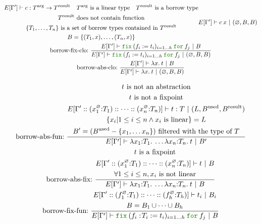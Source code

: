\documentclass[a4paper,fleqn]{article}
\newcommand{\kwfix}{\mbox{\color{mygreen}\ttfamily fix}}
\newcommand{\kwfor}{\mbox{\color{mygreen}\ttfamily for}}
\newcommand{\lam}[2]{\lambda #1.\:#2}
\newcommand{\lamTB}[2]{\lambda #1\mathord{:}#2.\:}
\newcommand{\lassum}[2]{(#1\mathord{:}#2)}
\newcommand{\fix}[4]{\kwfix\:(#1 := #2)_{#3}\:\kwfor\:#4}
\newcommand{\fixT}[5]{\kwfix\:(#1:\!#2 := #3)_{#4}\:\kwfor\:#5}
\begin{document}
\begin{gather*}
{\begin{gathered}
        E[\Gamma'] \vdash c : T^\text{arg} \rightarrow T^\text{result} \quad
        \text{$T^\text{arg}$ is a linear type} \quad
        \text{$T^\text{result}$ is a borrow type} \\
        \text{$T^\text{result}$ does not contain function} \\
        \text{$\{T_1, \ldots, T_n\}$ is a set of borrow types contained in $T^\text{result}$} \\
        B = \{(T_1,x),\ldots,(T_n,x)\}
      \end{gathered}
    }{
      E[\Gamma'] \vdash c\:x ~|~ (\varnothing, B, B)
    } \\
  \text{borrow-fix-clo:}~
    \dfrac{
      E[\Gamma'] \vdash \fix{f_i}{t_i}{i=1\ldots h}{f_j} ~|~ B
    }{
      E[\Gamma'] \vdash \fix{f_i}{t_i}{i=1\ldots h}{f_j} ~|~ (\varnothing, B, B)
    } \\
  \text{borrow-abs-clo:}~
    \dfrac{
      E[\Gamma'] \vdash \lam{x}{t} ~|~ B
    }{
      E[\Gamma'] \vdash \lam{x}{t} ~|~ (\varnothing, B, B)
    } \\
\end{gather*}

\begin{gather*}
  \text{borrow-abs-fun:}~
    \dfrac{
      \begin{gathered}
        \text{$t$ is not an abstraction} \\
        \text{$t$ is not a fixpoint} \\
        E[\Gamma'::\lassum{x_1^\varnothing}{T_1}::\cdots::\lassum{x_n^\varnothing}{T_n}] \vdash t : T ~|~ (L,B^\text{used},B^\text{result}) \\
        \{ x_i | 1 \leq i \leq n \wedge \text{$x_i$ is linear} \} = L \\
        B' = (B^\text{used} - \{x_1,\ldots x_n\}) ~\text{filtered with the type of $T$} \\
      \end{gathered}
    }{
      E[\Gamma'] \vdash \lamTB{x_1}{T_1}\ldots\lamTB{x_n}{T_n}t ~|~ B'
    } \\
  \text{borrow-abs-fix:}~
    \dfrac{
      \begin{gathered}
        \text{$t$ is a fixpoint} \\
        E[\Gamma'::\lassum{x_1^\varnothing}{T_1}::\cdots::\lassum{x_n^\varnothing}{T_n}] \vdash t ~|~ B \\
        \forall 1 \leq i \leq n, \text{$x_i$ is not linear} \\
      \end{gathered}
    }{
      E[\Gamma'] \vdash \lamTB{x_1}{T_1}\ldots\lamTB{x_n}{T_n}t ~|~ B
    } \\
  \text{borrow-fix-fun:}~
    \dfrac{
      \begin{gathered}
        E[\Gamma'::\lassum{f_1^\varnothing}{T_1}::\cdots::\lassum{f_h^\varnothing}{T_h}] \vdash t_i ~|~ B_i \\
        B = B_1\cup \cdots \cup B_h
      \end{gathered}
    }{
      E[\Gamma'] \vdash \fixT{f_i}{T_i}{t_i}{i=1\ldots h}{f_j} ~|~ B
    } \\
\end{gather*}
\end{document}
